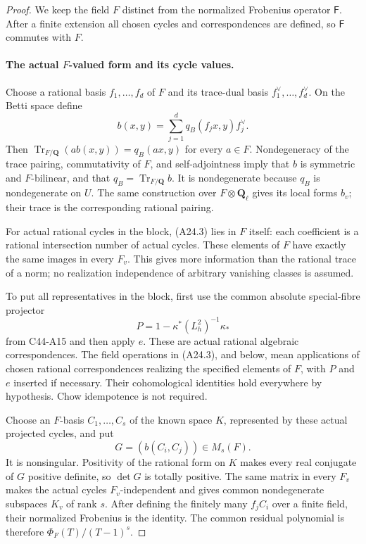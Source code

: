 \documentclass[11pt]{article}
\theoremstyle{remark}\newtheorem{remark}[theorem]{Remark}
\begin{document}
\begin{proof}
We keep the field $F$ distinct from the normalized Frobenius operator
$\mathsf F$.  After a finite extension all chosen cycles and
correspondences are defined, so $\mathsf F$ commutes with $F$.

\paragraph{The actual $F$-valued form and its cycle values.}
Choose a rational basis $f_1,\ldots,f_d$ of $F$ and its trace-dual basis
$f_1^\vee,\ldots,f_d^\vee$.  On the Betti space define
\[
             b(x,y)=\sum_{j=1}^d q_B(f_jx,y)f_j^\vee.
 \tag{A24.3}
\]
Then $\operatorname{Tr}_{F/\mathbf Q}(a b(x,y))=q_B(ax,y)$ for
every $a\in F$.  Nondegeneracy of the trace pairing, commutativity of
$F$, and self-adjointness imply that $b$ is symmetric and $F$-bilinear,
and that $q_B=\operatorname{Tr}_{F/\mathbf Q}b$.
It is nondegenerate because $q_B$ is nondegenerate on $U$.
The same construction over $F\otimes\mathbf Q_\ell$ gives its local
forms $b_v$; their trace is the corresponding rational pairing.

For actual rational cycles in the block, (A24.3) lies in $F$ itself:
each coefficient is a rational intersection number of actual cycles.
These elements of $F$ have exactly the same images in every $F_v$.
This gives more information than the rational trace of a norm; no
realization independence of arbitrary vanishing classes is assumed.

To put all representatives in the block, first use the common absolute
special-fibre projector
\[
       P=1-\kappa^*(L_h^2)^{-1}\kappa_*
 \tag{A24.4}
\]
from C44-A15 and then apply $e$.  These are actual rational algebraic
correspondences.  The field operations in (A24.3), and below, mean
applications of chosen rational correspondences realizing the
specified elements of $F$, with $P$ and $e$ inserted if necessary.
Their cohomological identities hold everywhere by hypothesis.  Chow
idempotence is not required.

Choose an $F$-basis $C_1,\ldots,C_s$ of the known space $K$, represented
by these actual projected cycles, and put
\[
                         G=(b(C_i,C_j))\in M_s(F).
 \tag{A24.5}
\]
It is nonsingular.  Positivity of the rational form on $K$ makes every
real conjugate of $G$ positive definite, so $\det G$ is totally positive.
The same matrix in every $F_v$ makes the actual cycles $F_v$-independent
and gives common nondegenerate subspaces $K_v$ of rank $s$.
After defining the finitely many $f_jC_i$ over a finite field, their
normalized Frobenius is the identity.  The common residual polynomial
is therefore $\Phi_F(T)/(T-1)^s$.


\end{proof}
\end{document}
